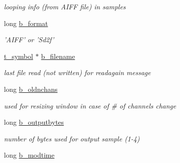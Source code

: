 \begin{DoxyCompactItemize}
\begin{DoxyCompactList}\small\item\em looping info (from AIFF file) in samples \item\end{DoxyCompactList}\item 
\hypertarget{structt__buffer_a75e91b559ff55ea445027831e4db7e67}{
long \hyperlink{structt__buffer_a75e91b559ff55ea445027831e4db7e67}{b\_\-format}}
\label{structt__buffer_a75e91b559ff55ea445027831e4db7e67}

\begin{DoxyCompactList}\small\item\em 'AIFF' or 'Sd2f' \item\end{DoxyCompactList}\item 
\hypertarget{structt__buffer_a4f2761b3209fd7c8a3dc6ce728e2976b}{
\hyperlink{structt__symbol}{t\_\-symbol} $\ast$ \hyperlink{structt__buffer_a4f2761b3209fd7c8a3dc6ce728e2976b}{b\_\-filename}}
\label{structt__buffer_a4f2761b3209fd7c8a3dc6ce728e2976b}

\begin{DoxyCompactList}\small\item\em last file read (not written) for readagain message \item\end{DoxyCompactList}\item 
\hypertarget{structt__buffer_ab39f2827a6e6b984d3a00a694877c280}{
long \hyperlink{structt__buffer_ab39f2827a6e6b984d3a00a694877c280}{b\_\-oldnchans}}
\label{structt__buffer_ab39f2827a6e6b984d3a00a694877c280}

\begin{DoxyCompactList}\small\item\em used for resizing window in case of \# of channels change \item\end{DoxyCompactList}\item 
\hypertarget{structt__buffer_ab5518aa23b30d50e4dd3c093aeed7315}{
long \hyperlink{structt__buffer_ab5518aa23b30d50e4dd3c093aeed7315}{b\_\-outputbytes}}
\label{structt__buffer_ab5518aa23b30d50e4dd3c093aeed7315}

\begin{DoxyCompactList}\small\item\em number of bytes used for output sample (1-\/4) \item\end{DoxyCompactList}\item 
\hypertarget{structt__buffer_af7153171460f3fc031af7435eb51faef}{
long \hyperlink{structt__buffer_af7153171460f3fc031af7435eb51faef}{b\_\-modtime}}
\label{structt__buffer_af7153171460f3fc031af7435eb51faef}


\end{DoxyCompactItemize}
